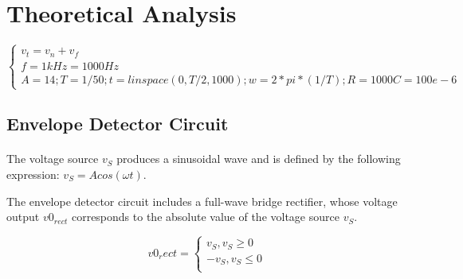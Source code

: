 \section{Theoretical Analysis}
\label{sec:analysis}

\paragraph{}

\[
\left\{\begin{matrix}
v_t=v_n+v_f\\
f = 1 kHz = 1000 Hz \\

A=14;
T=1/50;
t=linspace(0, T/2, 1000);
w=2*pi*(1/T);
R=1000
C=100e-6
\end{matrix}\right.
\]

\subsection{Envelope Detector Circuit}
\label{subsec:envelope}

\paragraph{}
The voltage source $v_S$ produces a sinusoidal wave and is defined by the following expression: $v_S=Acos(\omega t)$.

The envelope detector circuit includes a full-wave bridge rectifier, whose voltage output $v0_{rect}$ corresponds to the absolute value of the voltage source $v_S$.

\[
v0_rect =
\left\{\begin{matrix}
v_S, v_S \ge 0\\
-v_S, v_S \le 0\\
\end{matrix}\right.
\]

